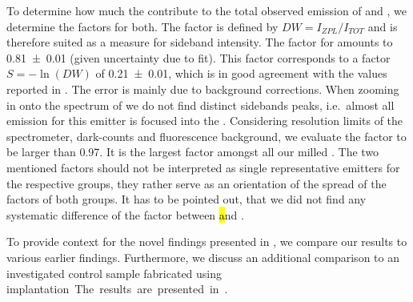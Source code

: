 	To determine how much the \ZPLs contribute to the total observed emission of \emnarrow and \embroad, we determine the \db factors for both.
	The \db factor is defined by $DW = I_{ZPL}/I_{TOT}$ and is therefore suited as a measure for sideband intensity.
	The \db factor for \emnarrow amounts to \num[separate-uncertainty]{0.81(1)} (given uncertainty due to fit).
	This \db factor corresponds to a \hr factor $S =- \ln{(DW)}$ \cite{Walker1979} of \num[separate-uncertainty]{0.21(1)}, which is in good agreement with the values reported in \cite{Neu2011b}.
	The error is mainly due to background corrections.
	When zooming in onto the spectrum of \embroad we do not find distinct sidebands peaks, i.e.\ almost all emission for this emitter is focused into the \ZPL.
	Considering resolution limits of the spectrometer, dark-counts and fluorescence background, we evaluate the \db factor to be larger than \num[separate-uncertainty]{0.97}.
	It is the largest \db factor amongst all our milled \sivs.
	The two mentioned \db factors should not be interpreted as single representative emitters for the respective groups, they rather serve as an orientation of the spread of the \db factors of both groups.
	It has to be pointed out, that we did not find any systematic difference of the \db factor between \hl and \vl.
	
	To provide context for the novel findings presented in , we compare our results to various earlier findings.
	Furthermore, we discuss an additional comparison to an investigated control sample fabricated using \si implantation.
	The results are presented in .


